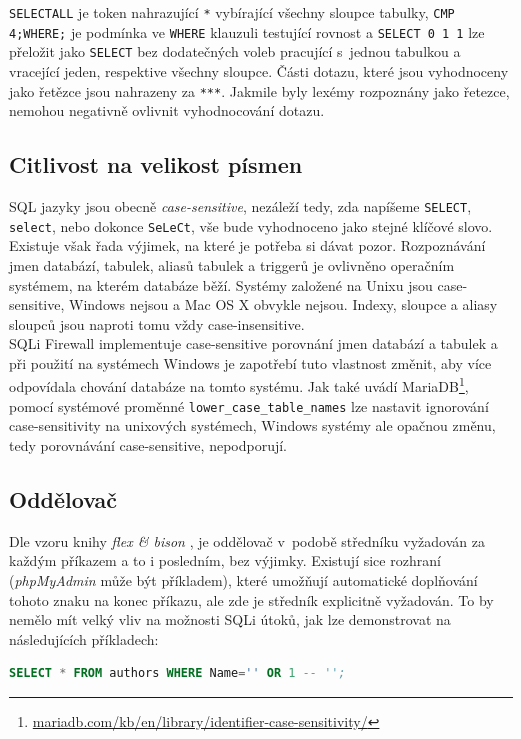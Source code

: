 \texttt{SELECTALL} je token nahrazující \texttt{*} vybírající všechny sloupce tabulky, \texttt{CMP 4;WHERE;} je podmínka ve \texttt{WHERE} klauzuli
testující rovnost a \texttt{SELECT 0 1 1} lze přeložit jako \texttt{SELECT} bez dodatečných voleb pracující s~jednou tabulkou a vracející jeden, respektive
všechny sloupce. Části dotazu, které jsou vyhodnoceny jako řetězce jsou nahrazeny za \texttt{***}. Jakmile byly lexémy rozpoznány jako řetezce,
nemohou negativně ovlivnit vyhodnocování dotazu.

\subsection{Citlivost na velikost písmen} \label{subsec:6:casesensitive}
SQL jazyky jsou obecně \textit{case-sensitive}, nezáleží tedy, zda napíšeme \texttt{SELECT}, \texttt{select}, nebo
dokonce \texttt{SeLeCt}, vše bude vyhodnoceno jako stejné klíčové slovo. Existuje však řada výjimek, na které je
potřeba si dávat pozor.
Rozpoznávání jmen databází, tabulek, aliasů tabulek a triggerů je ovlivněno operačním systémem, na kterém
databáze běží. Systémy založené na Unixu jsou case-sensitive, Windows nejsou a Mac OS X obvykle nejsou.
Indexy, sloupce a aliasy sloupců jsou naproti tomu vždy case-insensitive. \\

SQLi Firewall implementuje case-sensitive porovnání jmen databází a tabulek a při použití na systémech Windows je zapotřebí
tuto vlastnost změnit, aby více odpovídala chování databáze na tomto systému.
Jak také uvádí MariaDB\footnote{\url{mariadb.com/kb/en/library/identifier-case-sensitivity/}}, pomocí 
systémové proměnné \texttt{lower\_case\_table\_names} lze nastavit ignorování case-sensitivity na unixových systémech,
Windows systémy ale opačnou změnu, tedy porovnávání case-sensitive, nepodporují. 

\subsection{Oddělovač} \label{subsec:6:delimiter}
Dle vzoru knihy \textit{flex \& bison} \cite{levine2009}, je oddělovač v~podobě středníku vyžadován za každým příkazem a to i posledním, bez výjimky. 
Existují sice rozhraní (\textit{phpMyAdmin} může být příkladem), které umožňují automatické doplňování tohoto znaku na konec příkazu, 
ale zde je středník explicitně vyžadován. To by nemělo mít velký vliv na možnosti SQLi útoků, jak lze demonstrovat na následujících příkladech:
\begin{lstlisting}[language=sql]
SELECT * FROM authors WHERE Name='' OR 1 -- '';
\end{lstlisting}


